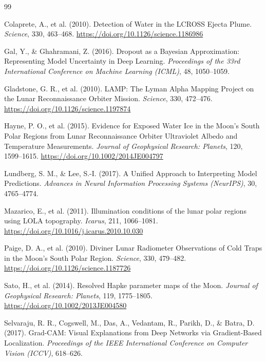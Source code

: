 \documentclass[12pt,a4paper]{article}
\begin{document}
\begin{thebibliography}{99}

Colaprete, A., et al. (2010).
Detection of Water in the LCROSS Ejecta Plume.
\textit{Science}, 330, 463--468.
\url{https://doi.org/10.1126/science.1186986}

Gal, Y., \& Ghahramani, Z. (2016).
Dropout as a Bayesian Approximation: Representing Model Uncertainty in Deep Learning.
\textit{Proceedings of the 33rd International Conference on Machine Learning (ICML)}, 48, 1050--1059.

Gladstone, G. R., et al. (2010).
LAMP: The Lyman Alpha Mapping Project on the Lunar Reconnaissance Orbiter Mission.
\textit{Science}, 330, 472--476.
\url{https://doi.org/10.1126/science.1197874}

Hayne, P. O., et al. (2015).
Evidence for Exposed Water Ice in the Moon's South Polar Regions from Lunar
Reconnaissance Orbiter Ultraviolet Albedo and Temperature Measurements.
\textit{Journal of Geophysical Research: Planets}, 120, 1599--1615.
\url{https://doi.org/10.1002/2014JE004797}

Lundberg, S. M., \& Lee, S.-I. (2017).
A Unified Approach to Interpreting Model Predictions.
\textit{Advances in Neural Information Processing Systems (NeurIPS)}, 30, 4765--4774.

Mazarico, E., et al. (2011).
Illumination conditions of the lunar polar regions using LOLA topography.
\textit{Icarus}, 211, 1066--1081.
\url{https://doi.org/10.1016/j.icarus.2010.10.030}

Paige, D. A., et al. (2010).
Diviner Lunar Radiometer Observations of Cold Traps in the Moon's South Polar Region.
\textit{Science}, 330, 479--482.
\url{https://doi.org/10.1126/science.1187726}

Sato, H., et al. (2014).
Resolved Hapke parameter maps of the Moon.
\textit{Journal of Geophysical Research: Planets}, 119, 1775--1805.
\url{https://doi.org/10.1002/2013JE004580}

Selvaraju, R. R., Cogswell, M., Das, A., Vedantam, R., Parikh, D., \& Batra, D. (2017).
Grad-CAM: Visual Explanations from Deep Networks via Gradient-Based Localization.
\textit{Proceedings of the IEEE International Conference on Computer Vision (ICCV)}, 618--626.


\end{thebibliography}
\end{document}
